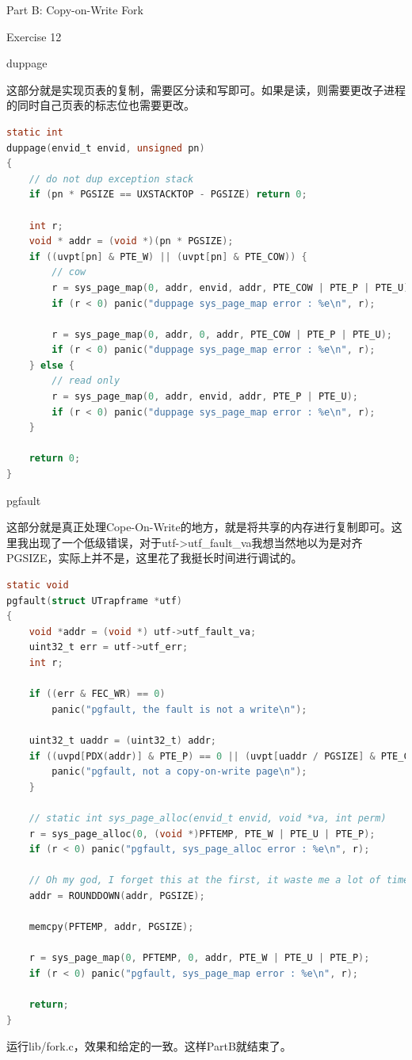 \documentclass[GBK,winfonts,a4paper,10pt]{ctexart}
\begin{document}
\begin{section}{Part B: Copy-on-Write Fork}
\begin{subsection}{ Exercise 12 }
\begin{subsubsection}{ duppage }
\par
这部分就是实现页表的复制，需要区分读和写即可。如果是读，则需要更改子进程的同时自己页表的标志位也需要更改。
\begin{lstlisting}[language = C]
static int
duppage(envid_t envid, unsigned pn)
{
	// do not dup exception stack
	if (pn * PGSIZE == UXSTACKTOP - PGSIZE) return 0;

	int r;
	void * addr = (void *)(pn * PGSIZE);
	if ((uvpt[pn] & PTE_W) || (uvpt[pn] & PTE_COW)) {
		// cow
		r = sys_page_map(0, addr, envid, addr, PTE_COW | PTE_P | PTE_U);
		if (r < 0) panic("duppage sys_page_map error : %e\n", r);
		
		r = sys_page_map(0, addr, 0, addr, PTE_COW | PTE_P | PTE_U);
		if (r < 0) panic("duppage sys_page_map error : %e\n", r);
	} else {
		// read only
		r = sys_page_map(0, addr, envid, addr, PTE_P | PTE_U);
		if (r < 0) panic("duppage sys_page_map error : %e\n", r);
	}

	return 0;
}
\end{lstlisting}
\end{subsubsection}


\begin{subsubsection}{ pgfault }
\par
这部分就是真正处理Cope-On-Write的地方，就是将共享的内存进行复制即可。这里我出现了一个低级错误，对于utf->utf\_fault\_va我想当然地以为是对齐PGSIZE，实际上并不是，这里花了我挺长时间进行调试的。
\begin{lstlisting}[language = C]
static void
pgfault(struct UTrapframe *utf)
{
	void *addr = (void *) utf->utf_fault_va;
	uint32_t err = utf->utf_err;
	int r;

	if ((err & FEC_WR) == 0)
		panic("pgfault, the fault is not a write\n");

	uint32_t uaddr = (uint32_t) addr;
	if ((uvpd[PDX(addr)] & PTE_P) == 0 || (uvpt[uaddr / PGSIZE] & PTE_COW) == 0) {
		panic("pgfault, not a copy-on-write page\n");
	}

	// static int sys_page_alloc(envid_t envid, void *va, int perm)
	r = sys_page_alloc(0, (void *)PFTEMP, PTE_W | PTE_U | PTE_P);
	if (r < 0) panic("pgfault, sys_page_alloc error : %e\n", r);

	// Oh my god, I forget this at the first, it waste me a lot of time to debug!!!
	addr = ROUNDDOWN(addr, PGSIZE);
	
	memcpy(PFTEMP, addr, PGSIZE);
	
	r = sys_page_map(0, PFTEMP, 0, addr, PTE_W | PTE_U | PTE_P);
	if (r < 0) panic("pgfault, sys_page_map error : %e\n", r);

	return;
}
\end{lstlisting}
\end{subsubsection}
\par
运行lib/fork.c，效果和给定的一致。这样PartB就结束了。
\end{subsection}

\end{section}
\end{document}
